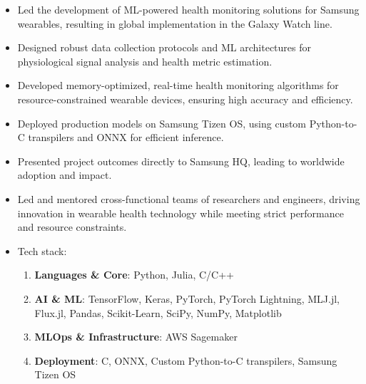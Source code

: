 {
\begin{itemize}
    \item Led the development of ML-powered health monitoring solutions for Samsung wearables, resulting in global implementation in the Galaxy Watch line.
    \item Designed robust data collection protocols and ML architectures for physiological signal analysis and health metric estimation.
    \item Developed memory-optimized, real-time health monitoring algorithms for resource-constrained wearable devices, ensuring high accuracy and efficiency.
    \item Deployed production models on Samsung Tizen OS, using custom Python-to-C transpilers and ONNX for efficient inference.
    \item Presented project outcomes directly to Samsung HQ, leading to worldwide adoption and impact.
    \item Led and mentored cross-functional teams of researchers and engineers, driving innovation in wearable health technology while meeting strict performance and resource constraints.
    \item Tech stack:
    \begin{enumerate}
        \item \textbf{Languages \& Core}: {\color{accent2}Python, Julia, C/C++}
        \item \textbf{AI \& ML}: {\color{accent2}TensorFlow, Keras, PyTorch, PyTorch Lightning, MLJ.jl, Flux.jl, Pandas, Scikit-Learn, SciPy, NumPy, Matplotlib}
        \item \textbf{MLOps \& Infrastructure}: {\color{accent2}AWS Sagemaker}
        \item \textbf{Deployment}: {\color{accent2}C, ONNX, Custom Python-to-C transpilers, Samsung Tizen OS}
    \end{enumerate}
\end{itemize}

\divider

}
